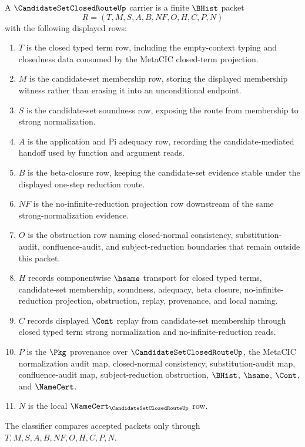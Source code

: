 \begin{definition}
\label{def:candidate-set-closed-route-carrier}
A $\CandidateSetClosedRouteUp$ carrier is a finite $\BHist$ packet
$$
R=(T,M,S,A,B,NF,O,H,C,P,N)
$$
with the following displayed rows:
\begin{enumerate}
\item $T$ is the closed typed term row, including the empty-context typing and closedness data consumed by the MetaCIC closed-term projection.
\item $M$ is the candidate-set membership row, storing the displayed membership witness rather than erasing it into an unconditional endpoint.
\item $S$ is the candidate-set soundness row, exposing the route from membership to strong normalization.
\item $A$ is the application and Pi adequacy row, recording the candidate-mediated handoff used by function and argument reads.
\item $B$ is the beta-closure row, keeping the candidate-set evidence stable under the displayed one-step reduction route.
\item $NF$ is the no-infinite-reduction projection row downstream of the same strong-normalization evidence.
\item $O$ is the obstruction row naming closed-normal consistency, substitution-audit, confluence-audit, and subject-reduction boundaries that remain outside this packet.
\item $H$ records componentwise $\hsame$ transport for closed typed terms, candidate-set membership, soundness, adequacy, beta closure, no-infinite-reduction projection, obstruction, replay, provenance, and local naming.
\item $C$ records displayed $\Cont$ replay from candidate-set membership through closed typed term strong normalization and no-infinite-reduction reads.
\item $P$ is the $\Pkg$ provenance over $\CandidateSetClosedRouteUp$, the MetaCIC normalization audit map, closed-normal consistency, substitution-audit map, confluence-audit map, subject-reduction obstruction, $\BHist$, $\hsame$, $\Cont$, and $\NameCert$.
\item $N$ is the local $\NameCert_{\CandidateSetClosedRouteUp}$ row.
\end{enumerate}
The classifier compares accepted packets only through $T,M,S,A,B,NF,O,H,C,P,N$.
\end{definition}

